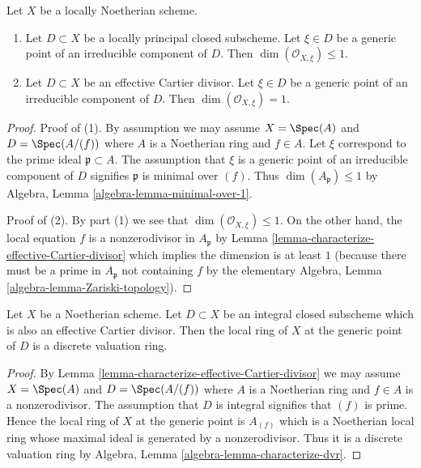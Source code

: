 \begin{lemma}
\label{lemma-effective-Cartier-codimension-1}
Let $X$ be a locally Noetherian scheme.
\begin{enumerate}
\item Let $D \subset X$ be a locally principal closed subscheme.
Let $\xi \in D$ be a generic point of an irreducible component of $D$.
Then $\dim(\mathcal{O}_{X, \xi}) \leq 1$.
\item Let $D \subset X$ be an effective Cartier divisor.
Let $\xi \in D$ be a generic point of an irreducible component of $D$.
Then $\dim(\mathcal{O}_{X, \xi}) = 1$.
\end{enumerate}
\end{lemma}

\begin{proof}
Proof of (1). By assumption we may assume $X = \Spec(A)$ and
$D = \Spec(A/(f))$ where $A$ is a Noetherian ring and $f \in A$.
Let $\xi$ correspond to the prime ideal $\mathfrak p \subset A$.
The assumption that $\xi$ is a generic point of an irreducible
component of $D$ signifies $\mathfrak p$ is minimal over $(f)$.
Thus $\dim(A_\mathfrak p) \leq 1$ by
Algebra, Lemma \ref{algebra-lemma-minimal-over-1}.

\medskip\noindent
Proof of (2). By part (1) we see that $\dim(\mathcal{O}_{X, \xi}) \leq 1$.
On the other hand, the local equation $f$ is a nonzerodivisor in
$A_\mathfrak p$ by Lemma \ref{lemma-characterize-effective-Cartier-divisor}
which implies the dimension is at least $1$ (because there must be a
prime in $A_\mathfrak p$ not containing $f$ by the elementary
Algebra, Lemma \ref{algebra-lemma-Zariski-topology}).
\end{proof}

\begin{lemma}
\label{lemma-integral-effective-Cartier-divisor-dvr}
Let $X$ be a Noetherian scheme. Let $D \subset X$ be an
integral closed subscheme which is also an
effective Cartier divisor. Then the local ring of $X$
at the generic point of $D$ is a discrete valuation ring.
\end{lemma}

\begin{proof}
By Lemma \ref{lemma-characterize-effective-Cartier-divisor}
we may assume $X = \Spec(A)$ and $D = \Spec(A/(f))$
where $A$ is a Noetherian ring and $f \in A$ is a nonzerodivisor.
The assumption that $D$ is integral signifies that $(f)$ is prime.
Hence the local ring of $X$ at the generic point is $A_{(f)}$
which is a Noetherian local ring whose maximal ideal is generated by
a nonzerodivisor. Thus it is a discrete valuation ring by
Algebra, Lemma \ref{algebra-lemma-characterize-dvr}.
\end{proof}

